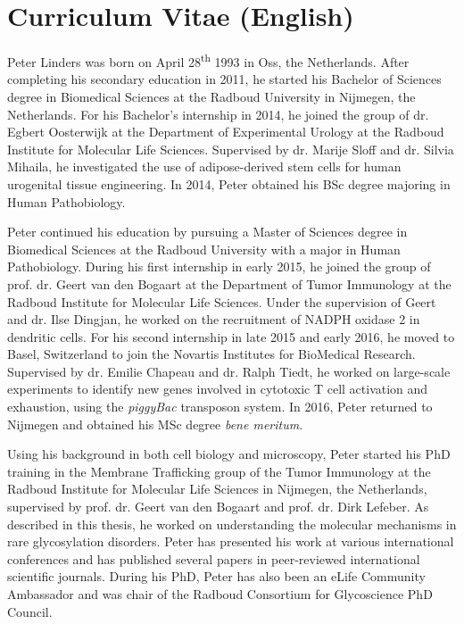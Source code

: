 \cleartoleftpage

\section{Curriculum Vitae (English)}

Peter Linders was born on April 28\textsuperscript{th} 1993 in Oss, the Netherlands. After completing his secondary education in 2011, he started his Bachelor of Sciences degree in Biomedical Sciences at the Radboud University in Nijmegen, the Netherlands. For his Bachelor's internship in 2014, he joined the group of dr. Egbert Oosterwijk at the Department of Experimental Urology at the Radboud Institute for Molecular Life Sciences. Supervised by dr. Marije Sloff and dr. Silvia Mihaila, he investigated the use of adipose-derived stem cells for human urogenital tissue engineering. In 2014, Peter obtained his BSc degree majoring in Human Pathobiology.

Peter continued his education by pursuing a Master of Sciences degree in Biomedical Sciences at the Radboud University with a major in Human Pathobiology. During his first internship in early 2015, he joined the group of prof. dr. Geert van den Bogaart at the Department of Tumor Immunology at the Radboud Institute for Molecular Life Sciences. Under the supervision of Geert and dr. Ilse Dingjan, he worked on the recruitment of NADPH oxidase 2 in dendritic cells. For his second internship in late 2015 and early 2016, he moved to Basel, Switzerland to join the Novartis Institutes for BioMedical Research. Supervised by dr. Emilie Chapeau and dr. Ralph Tiedt, he worked on large-scale experiments to identify new genes involved in cytotoxic T cell activation and exhaustion, using the \emph{piggyBac} transposon system. In 2016, Peter returned to Nijmegen and obtained his MSc degree \emph{bene meritum}.

Using his background in both cell biology and microscopy, Peter started his PhD training in the Membrane Trafficking group of the Tumor Immunology at the Radboud Institute for Molecular Life Sciences in Nijmegen, the Netherlands, supervised by prof. dr. Geert van den Bogaart and prof. dr. Dirk Lefeber. As described in this thesis, he worked on understanding the molecular mechanisms in rare glycosylation disorders. Peter has presented his work at various international conferences and has published several papers in peer-reviewed international scientific journals. During his PhD, Peter has also been an eLife Community Ambassador and was chair of the Radboud Consortium for Glycoscience PhD Council.

